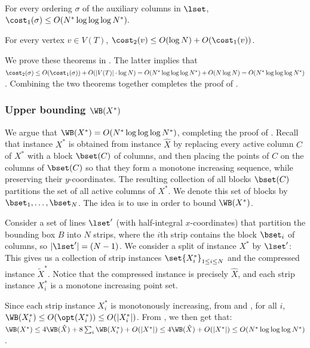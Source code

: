 \begin{theorem}\label{thm: crossings inside instances}
	For every ordering $\sigma$ of the auxiliary columns in $\lset$, $\cost_1(\sigma)\leq O(N^*\log\log\log N^*).$
	\end{theorem}


\begin{theorem}\label{thm: bound cost 2}
	For every vertex $v\in V(T)$, $\cost_2(v)\leq O(\log N)+O(\cost_1(v))$.
\end{theorem}


We prove these theorems in   . 
The latter implies that $\cost_2(\sigma)\leq O(\cost_1(\sigma))+O(|V(T)|\cdot \log N)=O(N^*\log\log\log N^*)+O(N\log N)=O(N^*\log\log\log N^*)$. Combining the two theorems together completes the proof of .



%
%
%
%
%
%
%
\subsubsection{Upper bounding $\WB(X^*)$}

We argue that $\WB(X^*)=O(N^*\log\log\log N^*)$, completing the proof of . 
Recall that instance $X^*$ is obtained from instance $\hat X$ by replacing every active column $C$ of $X^*$ with a block $\bset(C)$ of columns, and then placing the points of $C$ on the columns of $\bset(C)$ so that they form a monotone increasing sequence, while preserving their $y$-coordinates. 
The resulting collection of all blocks $\bset(C)$ partitions the set of all active columns of $X^*$. We denote this set of blocks by $\bset_1,\ldots,\bset_N$. 
The idea is to use  in order to bound $\WB(X^*)$. 


Consider a set of lines $\lset'$ (with half-integral $x$-coordinates) that partition the bounding box $B$ into $N$ strips, where the $i$th strip contains the block $\bset_i$ of columns, so $|\lset'| = (N-1)$. 
We consider a split of instance $X^*$ by $\lset'$: This gives us  a collection of strip instances $\set{X^*_i}_{1\leq i\leq N}$ and the compressed instance $\widetilde{X}^*$. 
Notice that the compressed instance is precisely $\hat{X}$, and each strip instance $X^*_i$ is a monotone increasing point set.   


%
Since each strip instance $X^*_i$ is monotonously increasing, from  and , for all $i$, $\WB(X^*_i)\leq O(\opt(X^*_i))\leq O(|X^*_i|)$. From , we then get that:
$\WB(X^*)\leq 4\WB(\hat X)+8\sum_i\WB(X^*_i)+O(|X^*|)\leq 4\WB(\hat X)+O(|X^*|)\leq O(N^*\log\log\log N^*)$.





